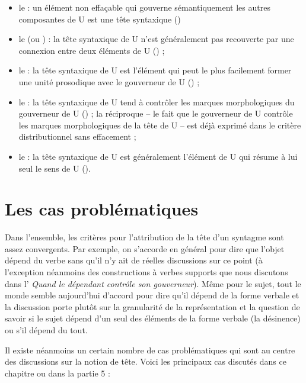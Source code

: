 \begin{itemize}
\item le  : un élément non effaçable qui gouverne sémantiquement les autres composantes de U est une tête syntaxique ()
\item le  (ou ) : la tête syntaxique de U n’est généralement pas recouverte par une connexion entre deux éléments de U () ;
\item le  : la tête syntaxique de U est l’élément qui peut le plus facilement former une unité prosodique avec le gouverneur de U () ;
\item\sloppy le  : la tête syntaxique de U tend à contrôler les marques morphologiques du gouverneur de U () ; la réciproque – le fait que le gouverneur de U contrôle les marques morphologiques de la tête de U – est déjà exprimé dans le critère distributionnel sans effacement ;
\item le  : la tête syntaxique de U est généralement l’élément de U qui résume à lui seul le sens de U ().
\end{itemize}

\section{Les cas problématiques}\label{sec:3.3.21}

Dans l’ensemble, les critères pour l’attribution de la tête d’un syntagme sont assez convergents. Par exemple, on s’accorde en général pour dire que l’objet dépend du verbe sans qu’il n’y ait de réelles discussions sur ce point (à l’exception néanmoins des constructions à verbes supports que nous discutons dans l’ \textit{Quand le dépendant contrôle son gouverneur}). Même pour le sujet, tout le monde semble aujourd’hui d’accord pour dire qu’il dépend de la forme verbale et la discussion porte plutôt sur la granularité de la représentation et la question de savoir si le sujet dépend d’un seul des éléments de la forme verbale (la désinence) ou s’il dépend du tout.

Il existe néanmoins un certain nombre de cas problématiques qui sont au centre des discussions sur la notion de tête. Voici les principaux cas discutés dans ce chapitre ou dans la partie 5 :

